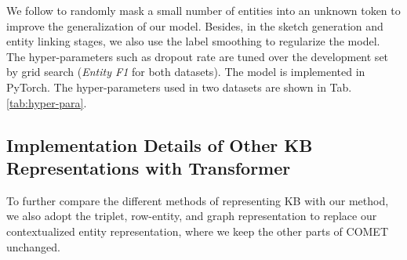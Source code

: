 \documentclass[11pt]{article}
\begin{document}
\begin{table}[htb]
\centering
{}
\caption{Hyper-parameters used in the two datasets.}
\label{tab:hyper-para}
\end{table}


We follow \cite{wu2018globaltolocal} to randomly mask a small number of entities into an unknown token to improve the generalization of our model. Besides, in the sketch generation and entity linking stages, we also use the label smoothing to regularize the model. The hyper-parameters such as dropout rate are tuned over the development set by grid search (\textit{Entity F1} for both datasets). The model is implemented in PyTorch. 
The hyper-parameters used in two datasets are shown in Tab. \ref{tab:hyper-para}.




\subsection{Implementation Details of Other KB Representations with Transformer}

To further compare the different methods of representing KB with our method, we also adopt the triplet, row-entity, and graph representation to replace our contextualized entity representation, where we keep the other parts of COMET unchanged. 
\end{document}
